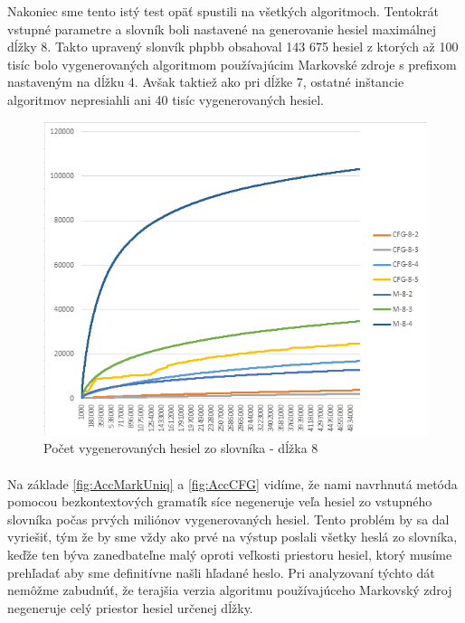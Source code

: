 Nakoniec sme tento istý test opäť spustili na všetkých algoritmoch. Tentokrát vstupné parametre a slovník boli nastavené na generovanie hesiel maximálnej dĺžky 8. Takto upravený slonvík phpbb obsahoval 143 675 hesiel z ktorých až 100 tisíc bolo vygenerovaných algoritmom používajúcim Markovské zdroje s prefixom nastaveným na dĺžku 4. Avšak taktiež ako pri dĺžke 7, ostatné inštancie algoritmov nepresiahli ani 40 tisíc vygenerovaných hesiel.

\begin{figure}[h]
    \centering
    \includegraphics[width=1\textwidth]{Accuracy_8}
    \caption{Počet vygenerovaných hesiel zo slovníka - dĺžka 8}
    \label{fig:Acc8}
\end{figure}

\paragraph{}
Na základe \ref{fig:AccMarkUniq} a \ref{fig:AccCFG} vidíme, že nami navrhnutá metóda pomocou bezkontextových gramatík síce negeneruje veľa hesiel zo vstupného slovníka počas prvých miliónov vygenerovaných hesiel. Tento problém by sa dal vyriešiť, tým že by sme vždy ako prvé na výstup poslali všetky heslá zo slovníka, keďže ten býva zanedbateľne malý oproti veľkosti priestoru hesiel, ktorý musíme prehľadať aby sme definitívne našli hľadané heslo. Pri analyzovaní týchto dát nemôžme zabudnúť, že terajšia verzia algoritmu používajúceho Markovský zdroj negeneruje celý priestor hesiel určenej dĺžky.

